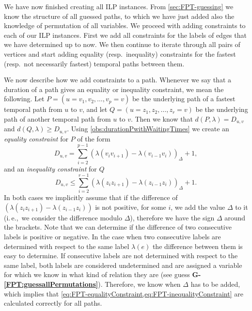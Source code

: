 \documentclass[a4paper,UKenglish,cleveref, autoref, thm-restate]{lipics-v2021}
\newcommand{\ie}{i.\,e.,\ }
\begin{document}
We have now finished creating all ILP instances.
From \cref{sec:FPT-guessing} we know the structure of all guessed paths, to which we have just added also the knowledge of permutation of all variables.
We proceed with adding constraints to each of our ILP instances.
First we add all constraints for the labels of edges that we have determined up to now.
We then continue to iterate through all pairs of vertices and start adding equality (resp.~inequality) constraints for the fastest (resp.~not necessarily fastest) temporal paths between them.

We now describe how we add constraints to a path. Whenever we say that a duration of a path gives an equality or inequality constraint, we mean the following.
Let $P=(u=v_1,v_2, \dots, v_p = v)$ be the underlying path of a fastest temporal path from $u$ to $v$,
and let $Q = (u=z_1,z_2, \dots, z_r = v)$ be the underlying path of another temporal path from $u$ to $v$.
Then we know that $d(P,\lambda) = D_{u,v}$ and $d(Q, \lambda) \geq D_{u,v}$.
Using \cref{obs:durationPwithWaitingTimes}
we create an \emph{equality constraint} for $P$
of the form 
\begin{equation}\label{eq:FPT-equalityConstraint}
    D_{u,v} = \sum _ {i=2} ^ {p-1} (\lambda (v_{i}v_{i+1}) - \lambda (v_{i-1}v_i))_\Delta + 1,
\end{equation}
and an \emph{inequality constraint} for $Q$ 
\begin{equation}\label{eq:FPT-inequalityConstraint}
    D_{u,v} \leq \sum _ {i=2} ^ {r-1} (\lambda (z_{i}z_{i+1}) - \lambda (z_{i-1}z_i))_\Delta + 1.
\end{equation}
In both cases we implicitly assume that if the difference of $(\lambda (z_{i}z_{i+1}) - \lambda (z_{i-1}z_i))$ is not positive, for some $i$, we add the value $\Delta$ to it (\ie we consider the difference modulo $\Delta$), therefore we have the sign $\Delta$ around the brackets.
Note that we can determine if the difference of two consecutive labels is positive or negative. 
In the case when two consecutive labels are determined with respect to the same label $\lambda(e)$ the difference between them is easy to determine.
If consecutive labels are not determined with respect to the same label, both labels are considered undetermined and are assigned a variable for which we know in what kind of relation they are (see guess \textcolor{lipicsGray}{\textsf{\textbf{G-\ref{FPT:guessallPermutations}}}}).
Therefore, we know when $\Delta$ has to be added, which implies that \cref{eq:FPT-equalityConstraint,eq:FPT-inequalityConstraint} are calculated correctly for all paths.
\end{document}

